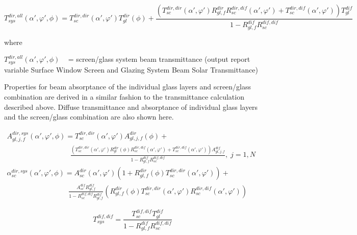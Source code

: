 \begin{equation}
T_{sys}^{dir,all}(\alpha ',\varphi ',\phi ) = T_{sc}^{dir,dir}(\alpha ',\varphi ')T_{gl}^{dir}\left( \phi  \right) + \frac{{(T_{sc}^{dir,dir}(\alpha ',\varphi ')R_{gl,f}^{dir}R_{sc}^{dir,dif}(\alpha ',\varphi ') + T_{sc}^{dir,dif}(\alpha ',\varphi '))T_{gl}^{dif}}}{{1 - R_{gl,f}^{dif}R_{sc}^{dif,dif}}}
\end{equation}

where

\(T_{sys}^{dir,all}(\alpha ',\varphi ',\phi )\) ~ = screen/glass system beam transmittance (output report variable Surface Window Screen and Glazing System Beam Solar Transmittance)

Properties for beam absorptance of the individual glass layers and screen/glass combination are derived in a similar fashion to the transmittance calculation described above. Diffuse transmittance and absorptance of individual glass layers and the screen/glass combination are also shown here.

\(\begin{array}{l}A_{gl,j,f}^{dir,sys}\left( {\alpha ',\varphi ',\phi } \right) = T_{sc}^{dir,dir}\left( {\alpha ',\varphi '} \right)A_{gl,j,f}^{dir}\left( \phi \right) + \\\;\;\;\;\;\;\;\;\;\;\;\;\;\;\,\,\,\,\,\,\,\,\,\,\,\,\,\,\,\,\,\,\,\,\;\;\;\;\;\;\frac{{\left( {T_{sc}^{dir,dir}\left( {\alpha ',\varphi '} \right)R_{gl}^{dir}\left( \phi \right)R_{sc}^{dir,dif}\left( {\alpha ',\varphi '} \right) + T_{sc}^{dir,dif}\left( {\alpha ',\varphi '} \right)} \right)A_{gl,j,f}^{dif}}}{{1 - R_{gl,f}^{dif}R_{sc}^{dif,dif}}},\;j = 1,N\end{array}\) \(\begin{array}{l}\alpha_{sc}^{dir,sys}\left( {\alpha ',\varphi ',\phi } \right) = A_{sc}^{dir}\left( {\alpha ',\varphi '} \right)\left( {1 + R_{gl,f}^{dir}\left( \phi \right)T_{sc}^{dir,dir}\left( {\alpha ',\varphi '} \right)} \right) + \\\;\;\;\;\;\;\;\;\;\;\;\;\;\;\;\;\;\;\;\;\;\;\;\;\;\;\;\;\;\;\;\frac{{A_{sc}^{dif}R_{gl,f}^{dif}}}{{1 - R_{sc}^{dif,dif}R_{gl,f}^{dif}}}\left( {R_{gl,f}^{dir}\left( \phi \right)T_{sc}^{dir,dir}\left( {\alpha ',\varphi '} \right)R_{sc}^{dir,dif}\left( {\alpha ',\varphi '} \right)} \right)\end{array}\)

\begin{equation}
T_{sys}^{dif,dif} = \frac{{T_{sc}^{dif,dif}T_{gl}^{dif}}}{{1 - R_{gl,f}^{dif}R_{sc}^{dif,dif}}}
\end{equation}

